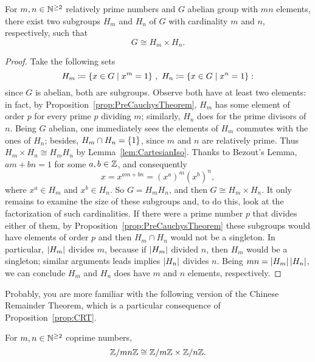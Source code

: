 \begin{proposition}\label{prop:CRT}
For \(m, n \in \mathbb N^{\ge 2}\) relatively prime numbers and \(G\) abelian group with \(mn\) elements, there exist two subgroups \(H_m\) and \(H_n\) of \(G\) with cardinality \(m\) and \(n\), respectively, such that
\[G \cong H_m \times H_n .\]
\end{proposition}

\begin{proof}
Take the following sets
\[H_m \coloneq \left\{x \in G \mid x^m = 1\right\}\,, \ H_n \coloneq \left\{x \in G \mid x^n = 1\right\}:\]
since \(G\) is abelian, both are subgroups. Observe both have at least two elements: in fact, by Proposition~\ref{prop:PreCauchysTheorem}, \(H_m\) has some element of order \(p\) for every prime \(p\) dividing \(m\); similarly, \(H_n\) does for the prime divisors of \(n\).\newline
Being \(G\) abelian, one immediately sees the elements of \(H_m\) commutes with the ones of \(H_n\); besides, \(H_m \cap H_n = \left\{1\right\}\), since \(m\) and \(n\) are relatively prime. Thus \(H_m \times H_n \cong H_m H_n\) by Lemma~\ref{lem:CartesianIso}. Thanks to Bezout's Lemma, \(am+bn = 1\) for some \(a, b \in \mathbb Z\), and consequently
\[x = x^{am+bn} = (x^a)^m (x^b)^n ,\]
where \(x^a \in H_m\) and \(x^b \in H_n\). So \(G = H_m H_n\), and then \(G \cong H_m \times H_n\).\newline
It only remains to examine the size of these subgroups and, to do this, look at the factorization of such cardinalities. If there were a prime number \(p\) that divides either of them, by Proposition~\ref{prop:PreCauchysTheorem} these subgroups would have elements of order \(p\) and then \(H_m \cap H_n\) would not be a singleton. In particular, \(\left\lvert H_m\right\rvert\) divides \(m\), because if \(\left\lvert H_m\right\rvert\) divided \(n\), then \(H_m\) would be a singleton; similar arguments leads implies \(\left\lvert H_n\right\rvert\) divides \(n\). Being \(mn = \left\lvert H_m\right\rvert \left\lvert H_n\right\rvert\), we can conclude \(H_m\) and \(H_n\) does have \(m\) and \(n\) elements, respectively.
\end{proof}

Probably, you are more familiar with the following version of the Chinese Remainder Theorem, which is a particular consequence of Proposition~\ref{prop:CRT}.

\begin{corollary}
For \(m, n \in \mathbb N^{\ge 2}\) coprime numbers,
\[\mathbb Z/mn\mathbb Z \cong \mathbb Z/m\mathbb Z \times \mathbb Z/n\mathbb Z .\]
\end{corollary}

